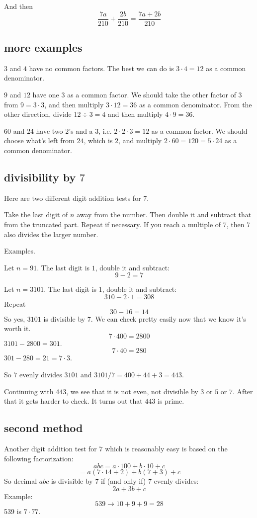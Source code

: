 \documentclass[11pt, oneside]{article}
\begin{document}
And then
\[ \frac{7a}{210} + \frac{2b}{210} = \frac{7a + 2b}{210} \]

\subsection*{more examples}

$3$ and $4$ have no common factors.  The best we can do is $3 \cdot 4 = 12$ as a common denominator. 

$9$ and $12$ have one $3$ as a common factor.  We should take the other factor of $3$ from $9 = 3 \cdot 3$, and then multiply $3 \cdot 12 = 36$ as a common denominator.  From the other direction, divide $12 \div 3 = 4$ and then multiply $4 \cdot 9 = 36$.

$60$ and $24$ have two $2$'s and a $3$, i.e. $2 \cdot 2 \cdot 3 = 12$ as a common factor.  We should choose what's left from $24$, which is $2$, and multiply $2 \cdot 60 = 120 =  5 \cdot 24$ as a common denominator.  

\subsection*{divisibility by $7$}

Here are two different digit addition tests for $7$.  

Take the last digit of $n$ away from the number.  Then double it and subtract that from the truncated part.  Repeat if necessary.  If you reach a multiple of $7$, then $7$ also divides the larger number.

Examples.

Let $n = 91$.  The last digit is $1$, double it and subtract:
\[ 9 - 2 = 7 \]

Let $n = 3101$.  The last digit is $1$, double it and subtract:
\[ 310 - 2 \cdot 1 = 308 \]
Repeat
\[ 30 - 16 = 14 \]
So yes, $3101$ is divisible by $7$.  We can check pretty easily now that we know it's worth it.
\[ 7 \cdot 400 = 2800 \]
$3101 - 2800 = 301$.
\[ 7 \cdot 40 = 280 \]
$301 - 280 = 21 = 7 \cdot 3$.

So $7$ evenly divides $3101$ and $3101/7 = 400 + 44 + 3 = 443$.

Continuing with $443$, we see that it is not even, not divisible by $3$ or $5$ or $7$.  After that it gets harder to check.  It turns out that $443$ is prime.

\subsection*{second method}
Another digit addition test for $7$ which is reasonably easy is based on the following factorization:
\[ abc = a \cdot 100 + b \cdot 10 + c \]
\[ = a(7 \cdot 14 + 2) + b(7 + 3) + c \]
So decimal $abc$ is divisible by $7$ if (and only if) $7$ evenly divides:
\[ 2a + 3b + c \]
Example:
\[ 539 \rightarrow 10 + 9 + 9 = 28 \]
539 is $7 \cdot 77$.
\end{document}
